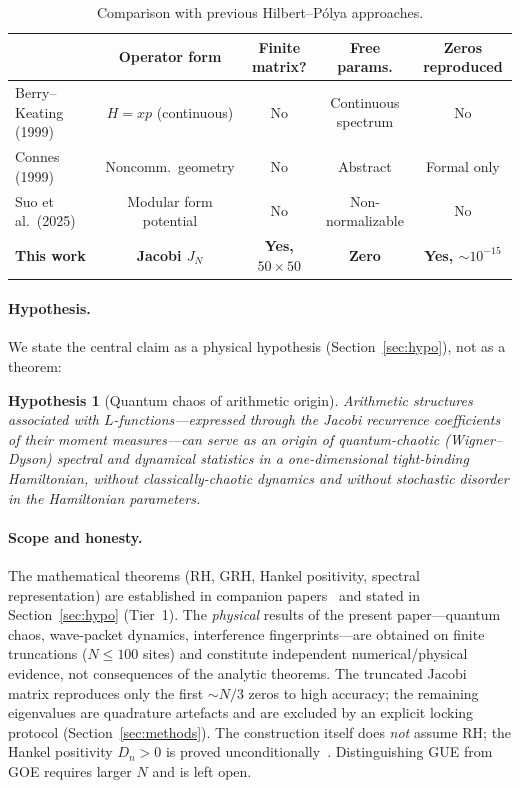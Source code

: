 \documentclass[aps,prx,reprint,floatfix]{revtex4-2}
\newtheorem{hyp}{Hypothesis}
\begin{document}
\begin{table}[htbp]
\centering
\caption{Comparison with previous Hilbert--P\'olya approaches.}
\label{tab:comparison}
\begin{tabular}{lcccc}
\toprule
 & \textbf{Operator form} & \textbf{Finite matrix?} & \textbf{Free params.} & \textbf{Zeros reproduced} \\
\midrule
Berry--Keating (1999)~\cite{berry1999} & $H=xp$ (continuous) & No & Continuous spectrum & No \\
Connes (1999)~\cite{connes1999} & Noncomm.\ geometry & No & Abstract & Formal only \\
Suo et al.\ (2025)~\cite{suo2025} & Modular form potential & No & Non-normalizable & No \\
\textbf{This work} & \textbf{Jacobi $J_N$} & \textbf{Yes, $50\times50$} & \textbf{Zero} & \textbf{Yes, $\sim10^{-15}$} \\
\bottomrule
\end{tabular}
\end{table}

\paragraph{Hypothesis.}
We state the central claim as a physical hypothesis (Section~\ref{sec:hypo}),
not as a theorem:

\begin{hyp}[Quantum chaos of arithmetic origin]
Arithmetic structures associated with $L$-functions---expressed through the
Jacobi recurrence coefficients of their moment measures---can serve as an
\emph{origin} of quantum-chaotic (Wigner--Dyson) spectral and dynamical
statistics in a one-dimensional tight-binding Hamiltonian, \emph{without}
classically-chaotic dynamics and \emph{without} stochastic disorder in the
Hamiltonian parameters.
\end{hyp}

\paragraph{Scope and honesty.}
The mathematical theorems (RH, GRH, Hankel positivity, spectral
representation) are established in companion papers~\cite{chen2026rh,
chen2026grh} and stated in Section~\ref{sec:hypo} (Tier~1). The
\emph{physical} results of the present paper---quantum chaos, wave-packet
dynamics, interference fingerprints---are obtained on finite truncations
($N\le100$ sites) and constitute independent numerical/physical evidence,
not consequences of the analytic theorems. The truncated Jacobi matrix
reproduces only the first $\sim N/3$ zeros to high accuracy; the remaining
eigenvalues are quadrature artefacts and are excluded by an explicit locking
protocol (Section~\ref{sec:methods}). The construction itself does
\emph{not} assume RH; the Hankel positivity $D_n>0$ is proved
unconditionally~\cite{chen2026rh}. Distinguishing GUE from GOE requires
larger $N$ and is left open.
\end{document}
